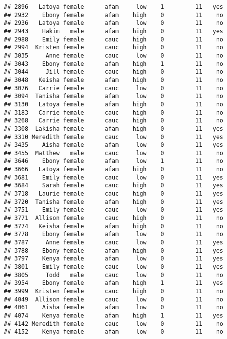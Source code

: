 \documentclass[
]{article}
\begin{document}
\begin{verbatim}
## 2896   Latoya female      afam     low    1         11   yes
## 2932    Ebony female      afam    high    0         11    no
## 2936   Latoya female      afam     low    0         11    no
## 2943    Hakim   male      afam    high    0         11   yes
## 2988    Emily female      cauc    high    0         11    no
## 2994  Kristen female      cauc    high    0         11    no
## 3035     Anne female      cauc     low    0         11    no
## 3043    Ebony female      afam    high    1         11    no
## 3044     Jill female      cauc    high    0         11    no
## 3048   Keisha female      afam    high    0         11    no
## 3076   Carrie female      cauc     low    0         11    no
## 3094  Tanisha female      afam     low    0         11    no
## 3130   Latoya female      afam    high    0         11    no
## 3183   Carrie female      cauc    high    0         11    no
## 3268   Carrie female      cauc    high    0         11    no
## 3308  Lakisha female      afam    high    0         11   yes
## 3310 Meredith female      cauc     low    0         11   yes
## 3435    Aisha female      afam     low    0         11   yes
## 3455  Matthew   male      cauc     low    0         11    no
## 3646    Ebony female      afam     low    1         11    no
## 3666   Latoya female      afam    high    0         11    no
## 3681    Emily female      cauc     low    0         11   yes
## 3684    Sarah female      cauc    high    0         11   yes
## 3718   Laurie female      cauc    high    0         11   yes
## 3720  Tanisha female      afam    high    0         11   yes
## 3751    Emily female      cauc     low    0         11   yes
## 3771  Allison female      cauc    high    0         11    no
## 3774   Keisha female      afam    high    0         11    no
## 3778    Ebony female      afam     low    0         11    no
## 3787     Anne female      cauc     low    0         11   yes
## 3788    Ebony female      afam    high    0         11   yes
## 3797    Kenya female      afam     low    0         11   yes
## 3801    Emily female      cauc     low    0         11   yes
## 3805     Todd   male      cauc     low    0         11    no
## 3954    Ebony female      afam    high    1         11   yes
## 3999  Kristen female      cauc    high    0         11    no
## 4049  Allison female      cauc     low    0         11    no
## 4061    Aisha female      afam     low    0         11    no
## 4074    Kenya female      afam    high    1         11   yes
## 4142 Meredith female      cauc     low    0         11    no
## 4152    Kenya female      afam     low    0         11    no

\end{verbatim}
\end{document}
